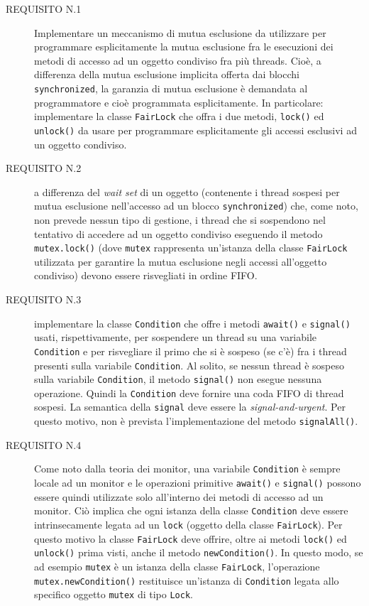 \documentclass[a4paper,twoside]{article}
\begin{document}
\begin{description}
\item[REQUISITO N.1] Implementare un meccanismo di mutua esclusione da utilizzare per programmare esplicitamente la mutua esclusione fra le esecuzioni dei metodi di accesso ad un oggetto condiviso fra più threads. Cioè, a differenza della mutua esclusione implicita offerta dai blocchi \texttt{synchronized}, la garanzia di mutua esclusione è demandata al programmatore e cioè programmata esplicitamente. In particolare: implementare la classe \texttt{FairLock} che offra i due metodi, \texttt{lock()} ed \texttt{unlock()} da usare per programmare esplicitamente gli accessi esclusivi ad un oggetto condiviso.

\item [REQUISITO N.2] a differenza del \emph{wait set} di un oggetto (contenente i thread sospesi per mutua esclusione nell'accesso ad un blocco \texttt{synchronized}) che, come noto, non prevede nessun tipo di gestione, i thread che si sospendono nel tentativo di accedere ad un oggetto condiviso eseguendo il metodo \texttt{mutex.lock()} (dove \texttt{mutex} rappresenta un'istanza della classe \texttt{FairLock} utilizzata per garantire la mutua esclusione negli accessi all'oggetto condiviso) devono essere risvegliati in ordine FIFO.

\item [REQUISITO N.3] implementare la classe \texttt{Condition} che offre i metodi \texttt{await()} e \texttt{signal()} usati, rispettivamente, per sospendere un thread su una variabile \texttt{Condition} e per risvegliare il primo che si è sospeso (se c'è) fra i thread presenti sulla variabile \texttt{Condition}. Al solito, se nessun thread è sospeso sulla variabile \texttt{Condition}, il metodo \texttt{signal()} non esegue nessuna operazione. Quindi la \texttt{Condition} deve fornire una coda FIFO di thread sospesi. La semantica della \texttt{signal} deve essere la \emph{signal-and-urgent}. Per questo motivo, non è prevista l'implementazione del metodo \texttt{signalAll()}.

\item [REQUISITO N.4] Come noto dalla teoria dei monitor, una variabile \texttt{Condition} è sempre locale ad un monitor e le operazioni primitive \texttt{await()} e \texttt{signal()} possono essere quindi utilizzate solo all'interno dei metodi di accesso ad un monitor. Ciò implica che ogni istanza della classe \texttt{Condition} deve essere intrinsecamente legata ad un \texttt{lock} (oggetto della classe \texttt{FairLock}). Per questo motivo la classe \texttt{FairLock} deve offrire, oltre ai metodi \texttt{lock()} ed \texttt{unlock()} prima visti, anche il metodo \texttt{newCondition()}. In questo modo, se ad esempio \texttt{mutex} è un istanza della classe \texttt{FairLock}, l'operazione \texttt{mutex.newCondition()} restituisce un'istanza di \texttt{Condition} legata allo specifico oggetto \texttt{mutex} di tipo \texttt{Lock}.
\end{description}
\endgroup
\end{document}
